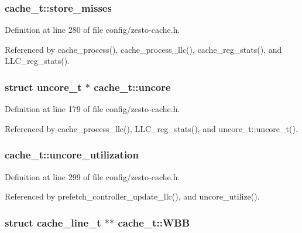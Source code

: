 \subsubsection[{store\_\-misses}]{ {\bf cache\_\-t::store\_\-misses}}\label{structcache__t_99d209df2eda215c3b1562e56a533906}




Definition at line 280 of file config/zesto-cache.h.

Referenced by cache\_\-process(), cache\_\-process\_\-llc(), cache\_\-reg\_\-stats(), and LLC\_\-reg\_\-stats().
\subsubsection[{uncore}]{\setlength{\rightskip}{0pt plus 5cm}struct {\bf uncore\_\-t} $\ast$ {\bf cache\_\-t::uncore}\hspace{0.3cm}{\tt  [read]}}\label{structcache__t_99fc82a104d554d95cb9a73a281a007a}




Definition at line 179 of file config/zesto-cache.h.

Referenced by cache\_\-process\_\-llc(), LLC\_\-reg\_\-stats(), and uncore\_\-t::uncore\_\-t().
\subsubsection[{uncore\_\-utilization}]{ {\bf cache\_\-t::uncore\_\-utilization}}\label{structcache__t_d856c8a6d21726bb4010206d50053b47}




Definition at line 299 of file config/zesto-cache.h.

Referenced by prefetch\_\-controller\_\-update\_\-llc(), and uncore\_\-utilize().
\subsubsection[{WBB}]{\setlength{\rightskip}{0pt plus 5cm}struct {\bf cache\_\-line\_\-t} $\ast$$\ast$ {\bf cache\_\-t::WBB}\hspace{0.3cm}{\tt  [read]}}\label{structcache__t_b2f15f41eadb21305652cc337190e380}




